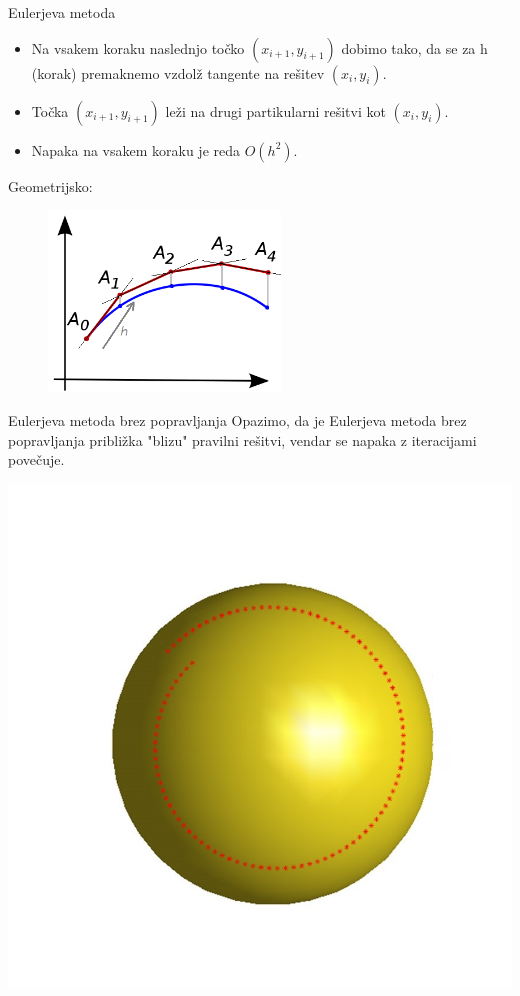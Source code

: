 \documentclass{beamer}
\begin{document}
	\begin{frame}{Eulerjeva metoda}
		\begin{itemize}
			\item Na vsakem koraku naslednjo točko $(x_{i+1},y_{i+1})$ dobimo tako, da se za h (korak) premaknemo vzdolž tangente na rešitev $(x_{i},y_{i})$. 
			\item Točka $(x_{i+1},y_{i+1})$ leži na drugi partikularni rešitvi kot $(x_{i},y_{i})$.
			\item Napaka na vsakem koraku je reda $O(h^2)$.
		\end{itemize}
		\begin{block}{Geometrijsko:}
			\begin{figure}
				\centering
				\includegraphics[width=0.55\textwidth]{Euler_method_geom}
			\end{figure}
		\end{block}
	\end{frame}
	
	\begin{frame}{Eulerjeva metoda brez popravljanja}
		Opazimo, da je Eulerjeva metoda brez popravljanja približka "blizu" pravilni rešitvi, vendar se napaka z iteracijami povečuje. \\
		\begin{center}
			\includegraphics[scale=0.30]{eul1}
		\end{center}
	\end{frame}
	
\end{document}
